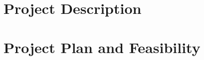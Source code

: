 \documentclass[12pt,a4paper]{article}
\begin{document}






\section*{Project Description}

\section*{Project Plan and Feasibility}


{}
\end{document}
